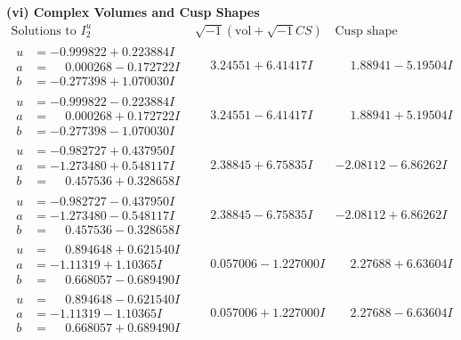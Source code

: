 \documentclass[1p]{elsarticle_modified}
\theoremstyle{definition}
\newcommand{\I}{\sqrt{-1}}
\begin{document}
\newpage\flushleft \textbf{(vi) Complex Volumes and Cusp Shapes}
$$\begin{array}{c|c|c}  
\text{Solutions to }I^u_{2}& \I (\text{vol} + \sqrt{-1}CS) & \text{Cusp shape}\\
 \hline 
\begin{aligned}
u &= -0.999822 + 0.223884 I \\
a &= \phantom{-}0.000268 - 0.172722 I \\
b &= -0.277398 + 1.070030 I\end{aligned}
 & \phantom{-}3.24551 + 6.41417 I & \phantom{-}1.88941 - 5.19504 I \\ \hline\begin{aligned}
u &= -0.999822 - 0.223884 I \\
a &= \phantom{-}0.000268 + 0.172722 I \\
b &= -0.277398 - 1.070030 I\end{aligned}
 & \phantom{-}3.24551 - 6.41417 I & \phantom{-}1.88941 + 5.19504 I \\ \hline\begin{aligned}
u &= -0.982727 + 0.437950 I \\
a &= -1.273480 + 0.548117 I \\
b &= \phantom{-}0.457536 + 0.328658 I\end{aligned}
 & \phantom{-}2.38845 + 6.75835 I & -2.08112 - 6.86262 I \\ \hline\begin{aligned}
u &= -0.982727 - 0.437950 I \\
a &= -1.273480 - 0.548117 I \\
b &= \phantom{-}0.457536 - 0.328658 I\end{aligned}
 & \phantom{-}2.38845 - 6.75835 I & -2.08112 + 6.86262 I \\ \hline\begin{aligned}
u &= \phantom{-}0.894648 + 0.621540 I \\
a &= -1.11319 + 1.10365 I \\
b &= \phantom{-}0.668057 - 0.689490 I\end{aligned}
 & \phantom{-}0.057006 - 1.227000 I & \phantom{-}2.27688 + 6.63604 I \\ \hline\begin{aligned}
u &= \phantom{-}0.894648 - 0.621540 I \\
a &= -1.11319 - 1.10365 I \\
b &= \phantom{-}0.668057 + 0.689490 I\end{aligned}
 & \phantom{-}0.057006 + 1.227000 I & \phantom{-}2.27688 - 6.63604 I \\ \hline\begin{aligned}

\end{aligned}
\end{array}$$
\end{document}
